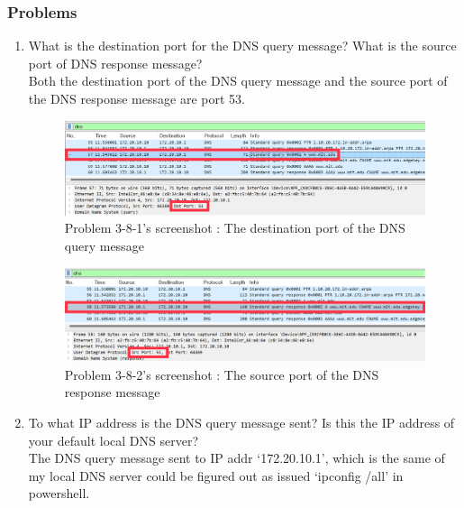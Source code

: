     \subsubsection*{Problems}
    \begin{enumerate}[label=\bfseries Problem \arabic*:,leftmargin=*,labelindent=1em]\addtocounter{enumi}{7}
        \item What is the destination port for the DNS query message? 
        What is the source port of DNS response message?\\[0.2mm]
            \soln Both the destination port of the DNS query message and the source port of the DNS response message are port 53.

            \begin{figure}[!h]\centering
        		\includegraphics[width=.79\textwidth]{image/result_week01/Q3-8-1.png}
        		\caption{\footnotesize Problem 3-8-1's screenshot : The destination port of the DNS query message}
        		\vspace{-10pt}
            \end{figure}
            \begin{figure}[!h]\centering
        		\includegraphics[width=.79\textwidth]{image/result_week01/Q3-8-2.png}
        		\caption{\footnotesize Problem 3-8-2's screenshot : The source port of the DNS response message}
        		\vspace{-10pt}
            \end{figure}
        \item To what IP address is the DNS query message sent? 
        Is this the IP address of your default local DNS server?\\[0.2mm]
            \soln The DNS query message sent to IP addr ‘172.20.10.1’, 
            which is the same of my local DNS server could be figured out as issued ‘ipconfig /all’ in powershell.

\end{enumerate}
